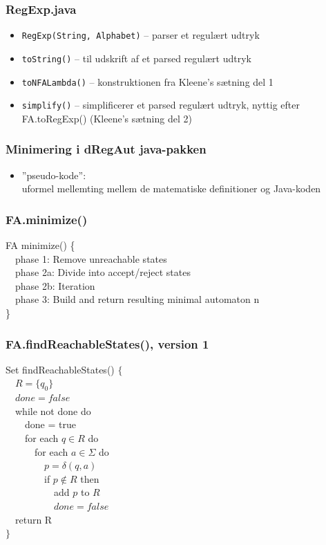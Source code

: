 \documentclass[]{beamer}
\begin{document}
\begin{frame}
\frametitle{RegExp.java}
\begin{itemize}[<+->]
\item \texttt{RegExp(String, Alphabet)}
 – parser et regulært udtryk
\item
\texttt{toString()}
 – til udskrift af et parsed regulært udtryk
\item
\texttt{toNFALambda()}
 – konstruktionen fra Kleene’s sætning del 1
\item
\texttt{simplify()}
 – simplificerer et parsed regulært udtryk, 
nyttig efter FA.toRegExp() (Kleene’s sætning del 2)
\end{itemize}
\end{frame}

\begin{frame}
\frametitle{Minimering i dRegAut java-pakken}
\begin{itemize}[<+->]
\item ”pseudo-kode”:\\
  uformel mellemting mellem 
  de matematiske definitioner 
og Java-koden
\end{itemize}
\end{frame}

\begin{frame}
\frametitle{FA.minimize()}
FA minimize() \{\\
\ \ phase 1: Remove unreachable states\\
\ \ phase 2a: Divide into accept/reject states\\
\ \ phase 2b: Iteration\\
\ \ phase 3: Build and return resulting minimal automaton n\\
\}
\end{frame}

\begin{frame}
\frametitle{FA.findReachableStates(), version 1}
Set findReachableStates() $\{$\\
\ \ $R = \{ q_0 \}$\\
\ \ $done = false$\\
\ \ while not done do\\
\ \ \ \ done = true\\
\ \ \ \ for each $q\in R$ do\\
\ \ \ \ \ \ for each $a\in \Sigma$ do\\
\ \ \ \ \ \ \ \ $p = \delta (q, a)$\\
\ \ \ \ \ \ \ \ if $p\not\in R$ then \\
\ \ \ \ \ \ \ \ \ \ add $p$ to $R$\\
\ \ \ \ \ \ \ \ \ \ $done = false$\\
\ \ return R\\
$\}$
\end{frame}
\end{document}
